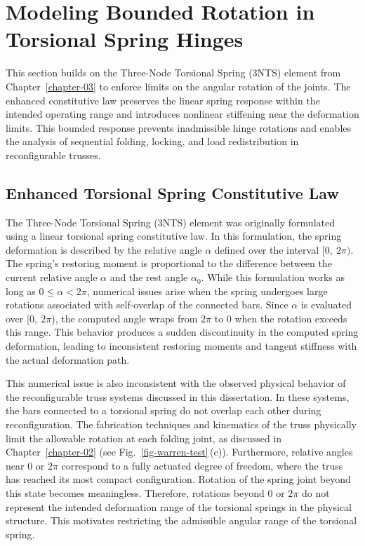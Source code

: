 \section{Modeling Bounded Rotation in Torsional Spring Hinges}\label{04-sec-bounded-rotation}
This section builds on the Three-Node Torsional Spring (3NTS) element from Chapter~\ref{chapter-03} to enforce limits on the angular rotation of the joints. The enhanced constitutive law preserves the linear spring response within the intended operating range and introduces nonlinear stiffening near the deformation limits. This bounded response prevents inadmissible hinge rotations and enables the analysis of sequential folding, locking, and load redistribution in reconfigurable trusses.

\subsection{Enhanced Torsional Spring Constitutive Law}\label{04-subsec-enhanced-spring}
The Three-Node Torsional Spring (3NTS) element was originally formulated using a linear torsional spring constitutive law. In this formulation, the spring deformation is described by the relative angle \(\alpha\) defined over the interval \([0,~2\pi)\). The spring's restoring moment is proportional to the difference between the current relative angle \(\alpha\) and the rest angle \(\alpha_0\). While this formulation works as long as \(0 \le \alpha < 2\pi\), numerical issues arise when the spring undergoes large rotations associated with self-overlap of the connected bars. Since \(\alpha\) is evaluated over [\(0,~2\pi\)), the computed angle wraps from \(2\pi\) to 0 when the rotation exceeds this range. This behavior produces a sudden discontinuity in the computed spring deformation, leading to inconsistent restoring moments and tangent stiffness with the actual deformation path.

This numerical issue is also inconsistent with the observed physical behavior of the reconfigurable truss systems discussed in this dissertation. In these systems, the bars connected to a torsional spring do not overlap each other during reconfiguration. The fabrication techniques and kinematics of the truss physically limit the allowable rotation at each folding joint, as discussed in Chapter~\ref{chapter-02} (see Fig.~\ref{fig-warren-test}\,(c)). Furthermore, relative angles near 0 or \(2\pi\) correspond to a fully actuated degree of freedom, where the truss has reached its most compact configuration. Rotation of the spring joint beyond this state becomes meaningless. Therefore, rotations beyond 0 or \(2\pi\) do not represent the intended deformation range of the torsional springs in the physical structure. This motivates restricting the admissible angular range of the torsional spring.

